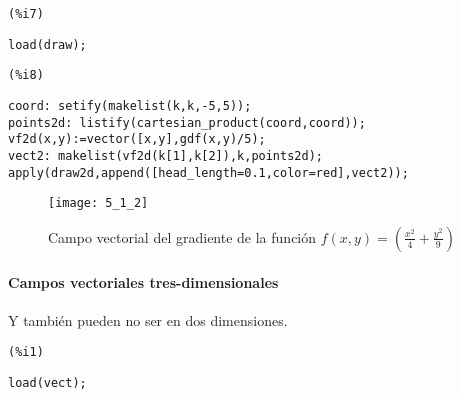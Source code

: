 \documentclass[12pt]{article}
\begin{document}
\noindent
\begin{minipage}[t]{8ex}{\color{red}\bf
\begin{verbatim}
(%i7) 
\end{verbatim}}
\end{minipage}
\begin{minipage}[t]{\textwidth}{\color{blue}
\begin{verbatim}
load(draw);
\end{verbatim}}
\end{minipage}

\noindent
\begin{minipage}[t]{8ex}{\color{red}\bf
\begin{verbatim}
(%i8) 
\end{verbatim}}
\end{minipage}
\begin{minipage}[t]{\textwidth}{\color{blue}
\begin{verbatim}
coord: setify(makelist(k,k,-5,5));
points2d: listify(cartesian_product(coord,coord));
vf2d(x,y):=vector([x,y],gdf(x,y)/5);
vect2: makelist(vf2d(k[1],k[2]),k,points2d);
apply(draw2d,append([head_length=0.1,color=red],vect2));
\end{verbatim}}
\end{minipage}

\begin{figure}[H]
\centering
\texttt{[image: 5\_1\_2]}
\caption{Campo vectorial del gradiente de la función $f(x,y)=(\frac{x^2}{4}+\frac{y^2}{9})$}
\end{figure}

\paragraph{Campos vectoriales tres-dimensionales} Y también pueden no ser en dos dimensiones.

\noindent
\begin{minipage}[t]{8ex}{\color{red}\bf
\begin{verbatim}
(%i1) 
\end{verbatim}}
\end{minipage}
\begin{minipage}[t]{\textwidth}{\color{blue}
\begin{verbatim}
load(vect);
\end{verbatim}}
\end{minipage}
\end{document}

